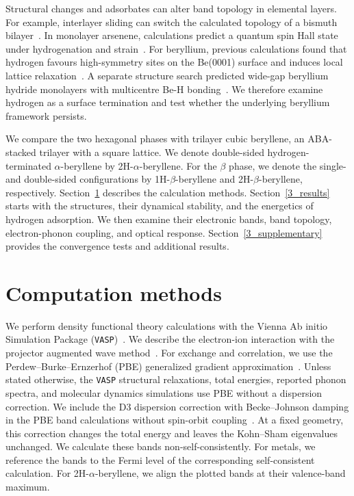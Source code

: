 Structural changes and adsorbates can alter band topology in elemental layers.
For example, interlayer sliding can switch the calculated topology of a bismuth bilayer~\cite{qian2025switchable}.
In monolayer arsenene, calculations predict a quantum spin Hall state under hydrogenation and strain~\cite{zhang2016controllable}.
For beryllium, previous calculations found that hydrogen favours high-symmetry sites on the Be(0001) surface and induces local lattice relaxation~\cite{bachurin2015ab}.
A separate structure search predicted wide-gap beryllium hydride monolayers with multicentre Be-H bonding~\cite{li2018global}.
We therefore examine hydrogen as a surface termination and test whether the underlying beryllium framework persists.

We compare the two hexagonal phases with trilayer cubic beryllene, an ABA-stacked trilayer with a square lattice.
We denote double-sided hydrogen-terminated $\alpha$-beryllene by 2H-$\alpha$-beryllene.
For the $\beta$ phase, we denote the single- and double-sided configurations by 1H-$\beta$-beryllene and 2H-$\beta$-beryllene, respectively.
Section~\ref{3_methods} describes the calculation methods.
Section~\ref{3_results} starts with the structures, their dynamical stability, and the energetics of hydrogen adsorption.
We then examine their electronic bands, band topology, electron-phonon coupling, and optical response.
Section~\ref{3_supplementary} provides the convergence tests and additional results.

\FloatBarrier
\section{Computation methods}
\label{3_methods}

We perform density functional theory calculations with the Vienna Ab initio Simulation Package (\texttt{VASP})~\cite{kresse1993ab,kresse1994ab,kresse1996efficiency,kresse1996efficient}.
We describe the electron-ion interaction with the projector augmented wave method~\cite{kresse1999ultrasoft}.
For exchange and correlation, we use the Perdew--Burke--Ernzerhof (PBE) generalized gradient approximation~\cite{perdew1996generalized}.
Unless stated otherwise, the \texttt{VASP} structural relaxations, total energies, reported phonon spectra, and molecular dynamics simulations use PBE without a dispersion correction.
We include the D3 dispersion correction with Becke--Johnson damping in the PBE band calculations without spin-orbit coupling~\cite{becke2005density,grimme2010consistent,grimme2011effect}.
At a fixed geometry, this correction changes the total energy and leaves the Kohn--Sham eigenvalues unchanged.
We calculate these bands non-self-consistently.
For metals, we reference the bands to the Fermi level of the corresponding self-consistent calculation.
For 2H-$\alpha$-beryllene, we align the plotted bands at their valence-band maximum.

